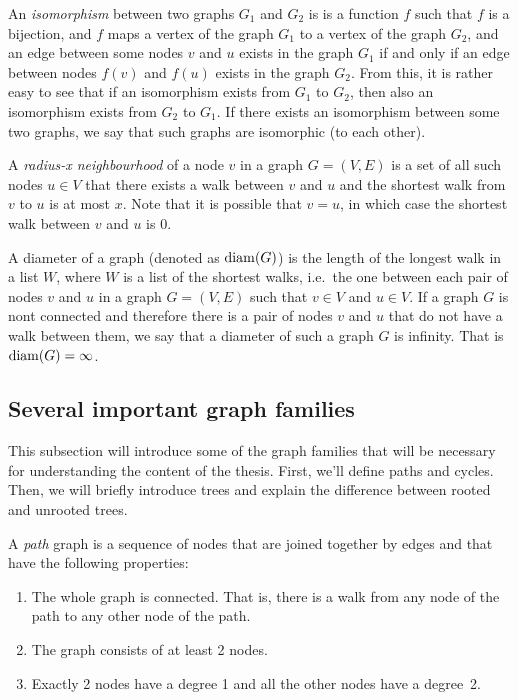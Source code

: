 An \emph{isomorphism} between two graphs $G_1$ and $G_2$ is is a function $f$ such that $f$ is a 
bijection, and $f$ maps a vertex of the graph $G_1$ to a vertex of the graph $G_2$, and 
an edge between some nodes $v$ and $u$ exists in the graph $G_1$ if and only if
an edge between nodes $f(v)$ and $f(u)$ exists in the graph $G_2$. From this,
it is rather easy to see that if an isomorphism exists from $G_1$ to $G_2$, then
also an isomorphism exists from $G_2$ to $G_1$. If there exists an
isomorphism between some two graphs, we say that such graphs are isomorphic
(to each other).

A \emph{radius-x neighbourhood} of a node $v$ in a graph $G = (V, E)$ is a set of
all such nodes $u \in V$ that there exists a walk between $v$ and $u$ and 
the shortest walk from $v$ to $u$ is at most $x$. Note that it is possible that
$v = u$, in which case the shortest walk between $v$ and $u$ is 0.

A diameter of a graph (denoted as $\operatorname{diam}(G)$) is the length of the longest walk
in a list $W$, where $W$ is a list of the shortest walks, i.e.\ the one between each pair of nodes
$v$ and $u$ in a graph $G = (V, E)$ such that $v \in V$ and $u \in V$. If a graph
$G$ is nont connected and therefore there is a pair of nodes $v$ and $u$ that do not
have a walk between them, we say that a diameter of such a graph $G$ is infinity. That
is $\operatorname{diam}(G) = \infty$.

\subsection{Several important graph families}

This subsection will introduce some of the graph families that will be necessary
for understanding the content of the thesis. First, we'll define paths and cycles.
Then, we will briefly introduce trees and explain the difference between rooted
and unrooted trees.

A \emph{path} graph is a sequence of nodes that are joined together by edges and
that have the following properties:

\begin{enumerate}
  \item The whole graph is connected. That is, there is a walk from any node of
  the path to any other node of the path.

  \item The graph consists of at least 2 nodes.

  \item Exactly 2 nodes have a degree 1 and all the other nodes have a degree~2.
\end{enumerate}

